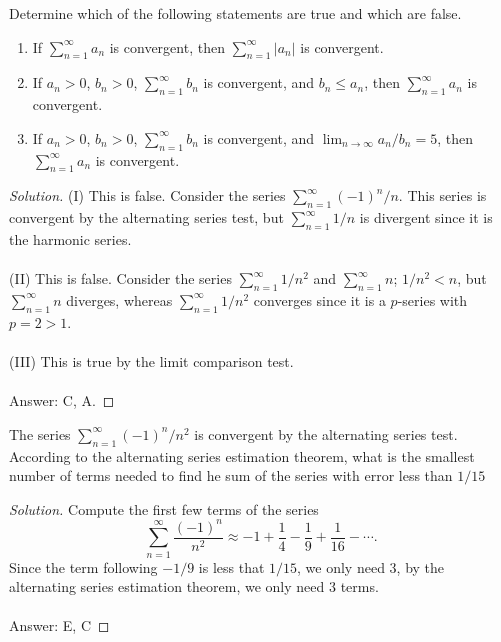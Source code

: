 \begin{problem}
Determine which of the following statements are true and which are false.
\begin{enumerate}[label=(\MakeUppercase{\roman*})]
\item If $\sum_{n=1}^\infty a_n$ is convergent, then
  $\sum_{n=1}^\infty|a_n|$ is convergent.
\item If $a_n>0$, $b_n>0$, $\sum_{n=1}^\infty b_n$ is convergent, and
  $b_n\leq a_n$, then $\sum_{n=1}^\infty a_n$ is convergent.
\item If $a_n>0$, $b_n>0$, $\sum_{n=1}^\infty b_n$ is convergent, and
  $\lim_{n\to\infty} a_n/b_n=5$, then $\sum_{n=1}^\infty a_n$ is convergent.
\end{enumerate}
\end{problem}
\begin{proof}[Solution]
(I) This is false. Consider the series $\sum_{n=1}^\infty(-1)^n/n$. This
series is convergent by the alternating series test, but $\sum_{n=1}^\infty
1/n$ is divergent since it is the harmonic series.
\\\\
(II) This is false. Consider the series $\sum_{n=1}^\infty1/n^2$ and
$\sum_{n=1}^\infty n$; $1/n^2<n$, but $\sum_{n=1}^\infty n$ diverges,
whereas $\sum_{n=1}^\infty 1/n^2$ converges since it is a $p$-series with
$p=2>1$.
\\\\
(III) This is true by the limit comparison test.
\\\\
Answer: {\color{Green} C}, {\color{Red} A}.
\end{proof}

\begin{problem}
The series $\sum_{n=1}^\infty (-1)^n/n^2$ is convergent by the alternating
series test. According to the alternating series estimation theorem, what
is the smallest number of terms needed to find he sum of the series with
error less than $1/15$
\end{problem}
\begin{proof}[Solution]
Compute the first few terms of the series
\[
\sum_{n=1}^\infty\frac{(-1)^n}{n^2}\approx
-1+\frac{1}{4}-\frac{1}{9}+\frac{1}{16}-\cdots.
\]
Since the term following $-1/9$ is less that $1/15$, we only need $3$, by
the alternating series estimation theorem, we only need $3$ terms.
\\\\
Answer: {\color{Green} E}, {\color{Red} C}
\end{proof}

